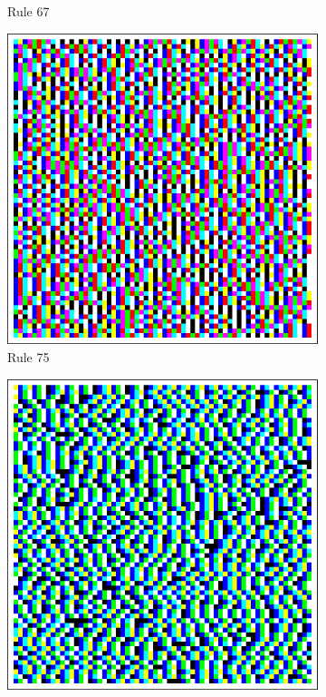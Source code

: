 \documentclass{article}
\begin{document}
\begin{figure}[H]
\begin{subfigure}[b]{0.135\textwidth}
        \vspace{-16pt}\caption*{Rule 67}
        \label{fig:rule-67-center_columns-4096}
    \end{subfigure}
    \begin{subfigure}[b]{0.135\textwidth}
        \centering
        \includegraphics[width=\textwidth]{graphics/behavior/center-columns/rule-75-center_columns-4096.pdf}
        \vspace{-16pt}\caption*{Rule 75}
        \label{fig:rule-75-center_columns-4096}
    \end{subfigure}
    \begin{subfigure}[b]{0.135\textwidth}
        \centering
        \includegraphics[width=\textwidth]{graphics/behavior/center-columns/rule-94-center_columns-4096.pdf}

\end{subfigure}
\end{figure}
\end{document}
